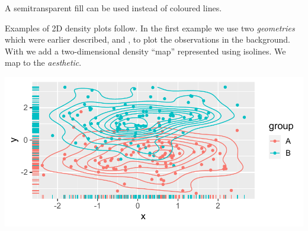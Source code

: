 \documentclass[krantz2]{krantz}\usepackage{knitr}
\begin{document}
A semitransparent fill can be used instead of coloured lines.

\begin{knitrout}\footnotesize
{}\color{fgcolor}\begin{kframe}
\begin{alltt}
    \hlopt{+}
  \hlstd{(} \hlstd{=} \hlstd{)}
\end{alltt}
\end{kframe}
\end{knitrout}


Examples of 2D density plots follow. In the first example we use two \emph{geometries} which were earlier described,  and , to plot the observations in the background. With  we add a two-dimensional density ``map'' represented using isolines. We map  to the  \emph{aesthetic}.

\begin{knitrout}\footnotesize
{}\color{fgcolor}\begin{kframe}
\begin{alltt}
    \hlopt{+}
  \hlstd{()} \hlopt{+}
  \hlstd{()} \hlopt{+}
  \hlstd{()}
\end{alltt}
\end{kframe}

{\centering \includegraphics[width=.7\textwidth]{figure/pos-density-plot-10-1} 

}


\end{knitrout}
\end{document}
